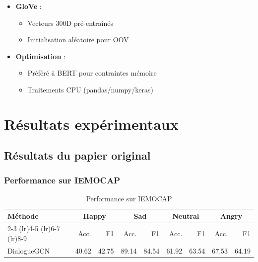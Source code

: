 \documentclass[a4paper,11pt]{article}
\begin{document}
\begin{itemize}
  \item \textbf{GloVe} \cite{pennington2014glove} :
    \begin{itemize}
      \item Vecteurs 300D pré-entraînés
      \item Initialisation aléatoire pour OOV
    \end{itemize}
  
  \item \textbf{Optimisation} :
    \begin{itemize}
      \item Préféré à BERT pour contraintes mémoire
      \item Traitements CPU (pandas/numpy/keras)
    \end{itemize}
\end{itemize}


\newpage
\section{Résultats expérimentaux}

\subsection{Résultats du papier original}

\subsubsection{Performance sur IEMOCAP}
\begin{table}[htbp]
  \centering
  \begin{tabular}{lrrrrrrrr}
    \toprule
    Méthode & \multicolumn{2}{c}{Happy} & \multicolumn{2}{c}{Sad} & \multicolumn{2}{c}{Neutral} & \multicolumn{2}{c}{Angry} \\
    \cmidrule(lr){2-3} \cmidrule(lr){4-5} \cmidrule(lr){6-7} \cmidrule(lr){8-9}
    & Acc. & F1 & Acc. & F1 & Acc. & F1 & Acc. & F1 \\
    \midrule
     DialogueGCN & 40.62 & 42.75 & 89.14 & 84.54 & 61.92 & 63.54 & 67.53 & 64.19 \\
    \bottomrule
  \end{tabular}
  \caption{Performance sur IEMOCAP \cite{ghosal2019dialoguegcn}}
  \label{tab:orig_iemocap}
\end{table}
\end{document}
